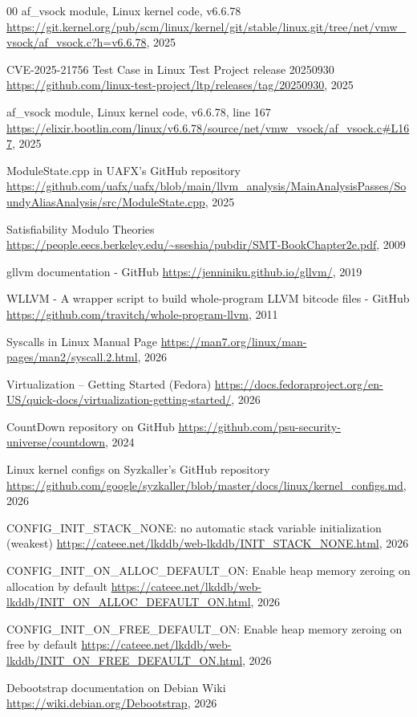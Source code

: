 \begin{thebibliography}{00}
af\_vsock module, Linux kernel code, v6.6.78
\url{https://git.kernel.org/pub/scm/linux/kernel/git/stable/linux.git/tree/net/vmw_vsock/af_vsock.c?h=v6.6.78}, 2025

CVE-2025-21756 Test Case in Linux Test Project release 20250930
\url{https://github.com/linux-test-project/ltp/releases/tag/20250930}, 2025

af\_vsock module, Linux kernel code, v6.6.78, line 167
\url{https://elixir.bootlin.com/linux/v6.6.78/source/net/vmw_vsock/af_vsock.c#L167}, 2025

ModuleState.cpp in UAFX's GitHub repository
\url{https://github.com/uafx/uafx/blob/main/llvm_analysis/MainAnalysisPasses/SoundyAliasAnalysis/src/ModuleState.cpp}, 2025


Satisfiability Modulo Theories
\url{https://people.eecs.berkeley.edu/~sseshia/pubdir/SMT-BookChapter2e.pdf}, 2009

gllvm documentation - GitHub
\url{https://jenniniku.github.io/gllvm/}, 2019

WLLVM - A wrapper script to build whole-program LLVM bitcode files - GitHub
\url{https://github.com/travitch/whole-program-llvm}, 2011

Syscalls in Linux Manual Page
\url{https://man7.org/linux/man-pages/man2/syscall.2.html}, 2026


Virtualization – Getting Started (Fedora)
\url{https://docs.fedoraproject.org/en-US/quick-docs/virtualization-getting-started/}, 2026

CountDown repository on GitHub
\url{https://github.com/psu-security-universe/countdown}, 2024

Linux kernel configs on Syzkaller's GitHub repository
\url{https://github.com/google/syzkaller/blob/master/docs/linux/kernel_configs.md}, 2026

CONFIG\_INIT\_STACK\_NONE: no automatic stack variable initialization (weakest)
\url{https://cateee.net/lkddb/web-lkddb/INIT_STACK_NONE.html}, 2026

CONFIG\_INIT\_ON\_ALLOC\_DEFAULT\_ON: Enable heap memory zeroing on allocation by default
\url{https://cateee.net/lkddb/web-lkddb/INIT_ON_ALLOC_DEFAULT_ON.html}, 2026

CONFIG\_INIT\_ON\_FREE\_DEFAULT\_ON: Enable heap memory zeroing on free by default
\url{https://cateee.net/lkddb/web-lkddb/INIT_ON_FREE_DEFAULT_ON.html}, 2026

Debootstrap documentation on Debian Wiki
\url{https://wiki.debian.org/Debootstrap}, 2026

\end{thebibliography}